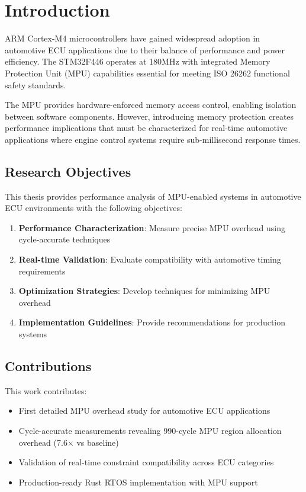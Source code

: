 \chapter{Introduction}
\label{sec:introduction}

ARM Cortex-M4 microcontrollers have gained widespread adoption in automotive ECU applications due to their balance of performance and power efficiency. The STM32F446 operates at 180MHz with integrated Memory Protection Unit (MPU) capabilities essential for meeting ISO 26262 functional safety standards.

The MPU provides hardware-enforced memory access control, enabling isolation between software components. However, introducing memory protection creates performance implications that must be characterized for real-time automotive applications where engine control systems require sub-millisecond response times.

\section{Research Objectives}

This thesis provides performance analysis of MPU-enabled systems in automotive ECU environments with the following objectives:

\begin{enumerate}
    \item \textbf{Performance Characterization}: Measure precise MPU overhead using cycle-accurate techniques
    \item \textbf{Real-time Validation}: Evaluate compatibility with automotive timing requirements
    \item \textbf{Optimization Strategies}: Develop techniques for minimizing MPU overhead
    \item \textbf{Implementation Guidelines}: Provide recommendations for production systems
\end{enumerate}

\section{Contributions}

This work contributes:
\begin{itemize}
    \item First detailed MPU overhead study for automotive ECU applications
    \item Cycle-accurate measurements revealing 990-cycle MPU region allocation overhead (7.6× vs baseline)
    \item Validation of real-time constraint compatibility across ECU categories
    \item Production-ready Rust RTOS implementation with MPU support
\end{itemize}